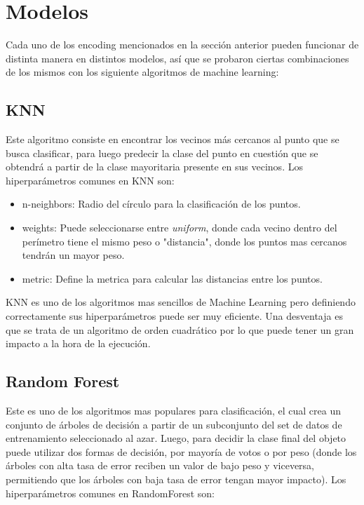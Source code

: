 \documentclass[12pt,a4paper]{article}
\begin{document}
\section{Modelos}
Cada uno de los encoding mencionados en la sección anterior pueden funcionar de distinta manera en distintos modelos, así que se probaron ciertas combinaciones de los mismos con los siguiente algoritmos de machine learning:

\subsection{KNN}
Este algoritmo consiste en encontrar los vecinos más cercanos al punto que se busca clasificar, para luego predecir la clase del punto en cuestión que se obtendrá a partir de la clase mayoritaria presente en sus vecinos.
Los hiperparámetros comunes en KNN son:
\begin{itemize}
    \item n-neighbors: Radio del círculo para la clasificación de los puntos.
    
    \item weights: Puede seleccionarse entre \textit{uniform}, donde cada vecino dentro del perímetro tiene el mismo peso o "distancia", donde los puntos mas cercanos tendrán un mayor peso.
    
    \item metric: Define la metrica para calcular las distancias entre los puntos.
    
\end{itemize}
KNN es uno de los algoritmos mas sencillos de Machine Learning pero definiendo correctamente sus hiperparámetros puede ser muy eficiente. Una desventaja es que se trata de un algoritmo de orden cuadrático por lo que puede tener un gran impacto a la hora de la ejecución.

\subsection{Random Forest}
Este es uno de los algoritmos mas populares para clasificación, el cual crea un conjunto de árboles de decisión a partir de un subconjunto del set de datos de entrenamiento seleccionado al azar. 
Luego, para decidir la clase final del objeto puede utilizar dos formas de decisión, por mayoría de votos o por peso (donde los árboles con alta tasa de error reciben un valor de bajo peso y viceversa, permitiendo que los árboles con baja tasa de error tengan mayor impacto).
Los hiperparámetros comunes en RandomForest son:
\end{document}
